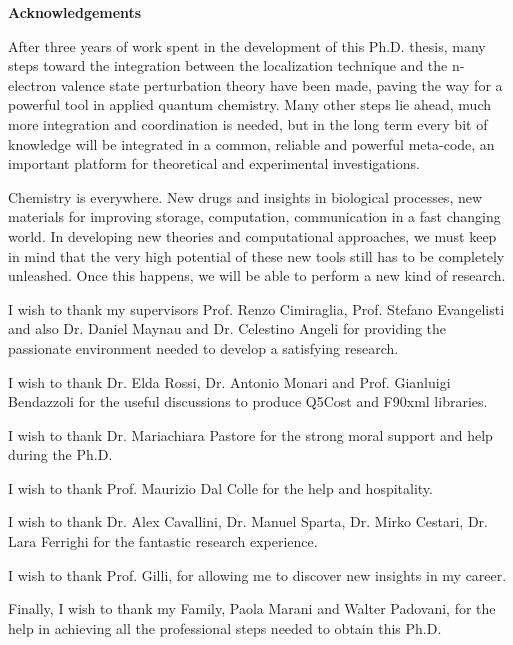 \pagebreak
{\Huge \textbf{Acknowledgements}}
\vspace{6mm}

After three years of work spent in the development of this Ph.D. thesis,
many steps toward the integration between the localization technique and the
n-electron valence state perturbation theory have been made, paving the way
for a powerful tool in applied quantum chemistry. Many other steps lie
ahead, much more integration and coordination is needed, but in the long
term every bit of knowledge will be integrated in a common, reliable and
powerful meta-code, an important platform for theoretical and experimental
investigations.

Chemistry is everywhere. New drugs and insights in biological processes, new
materials for improving storage, computation, communication in a fast
changing world. In developing new theories and computational approaches, we
must keep in mind that the very high potential of these new tools still has
to be completely unleashed. Once this happens, we will be able to perform a
new kind of research.

I wish to thank my supervisors Prof. Renzo Cimiraglia, Prof. Stefano
Evangelisti and also Dr. Daniel Maynau and Dr. Celestino Angeli for
providing the passionate environment needed to develop a satisfying
research.

I wish to thank Dr. Elda Rossi, Dr. Antonio Monari and Prof. Gianluigi
Bendazzoli for the useful discussions to produce Q5Cost and F90xml
libraries.

I wish to thank Dr. Mariachiara Pastore for the strong moral support and
help during the Ph.D.

I wish to thank Prof. Maurizio Dal Colle for the help and hospitality.

I wish to thank Dr. Alex Cavallini, Dr. Manuel Sparta, Dr. Mirko Cestari,
Dr. Lara Ferrighi for the fantastic research experience.

I wish to thank Prof. Gilli, for allowing me to discover new insights in my
career.

Finally, I wish to thank my Family, Paola Marani and Walter Padovani, for
the help in achieving all the professional steps needed to obtain this Ph.D.
